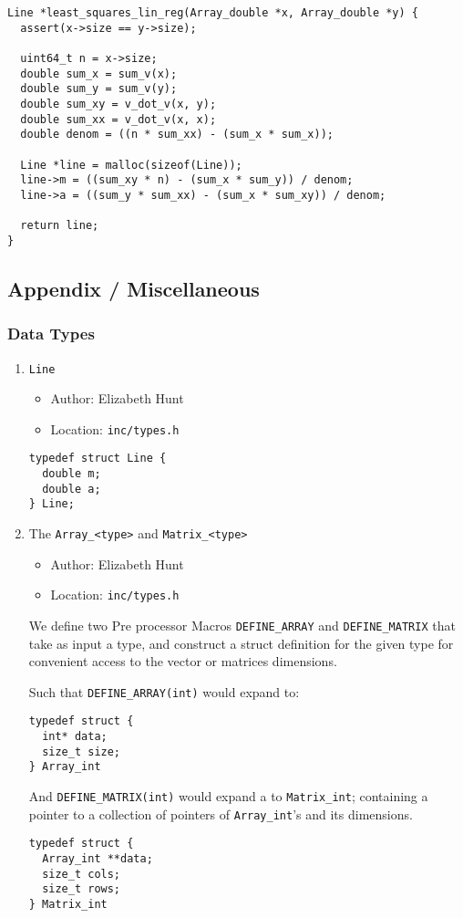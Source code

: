 \documentclass[11pt]{article}
\begin{document}
\begin{verbatim}
Line *least_squares_lin_reg(Array_double *x, Array_double *y) {
  assert(x->size == y->size);

  uint64_t n = x->size;
  double sum_x = sum_v(x);
  double sum_y = sum_v(y);
  double sum_xy = v_dot_v(x, y);
  double sum_xx = v_dot_v(x, x);
  double denom = ((n * sum_xx) - (sum_x * sum_x));

  Line *line = malloc(sizeof(Line));
  line->m = ((sum_xy * n) - (sum_x * sum_y)) / denom;
  line->a = ((sum_y * sum_xx) - (sum_x * sum_xy)) / denom;

  return line;
}
\end{verbatim}
\subsection{Appendix / Miscellaneous}
\label{sec:org0130d70}
\subsubsection{Data Types}
\label{sec:org8aa1c01}
\begin{enumerate}
\item \texttt{Line}
\label{sec:org596b0e7}
\begin{itemize}
\item Author: Elizabeth Hunt
\item Location: \texttt{inc/types.h}
\end{itemize}

\begin{verbatim}
typedef struct Line {
  double m;
  double a;
} Line;
\end{verbatim}
\item The \texttt{Array\_<type>} and \texttt{Matrix\_<type>}
\label{sec:org9d1c7c3}
\begin{itemize}
\item Author: Elizabeth Hunt
\item Location: \texttt{inc/types.h}
\end{itemize}

We define two Pre processor Macros \texttt{DEFINE\_ARRAY} and \texttt{DEFINE\_MATRIX} that take
as input a type, and construct a struct definition for the given type for
convenient access to the vector or matrices dimensions.

Such that \texttt{DEFINE\_ARRAY(int)} would expand to:

\begin{verbatim}
typedef struct {
  int* data;
  size_t size;
} Array_int
\end{verbatim}

And \texttt{DEFINE\_MATRIX(int)} would expand a to \texttt{Matrix\_int}; containing a pointer to
a collection of pointers of \texttt{Array\_int}'s and its dimensions.

\begin{verbatim}
typedef struct {
  Array_int **data;
  size_t cols;
  size_t rows;
} Matrix_int
\end{verbatim}
\end{enumerate}
\end{document}
